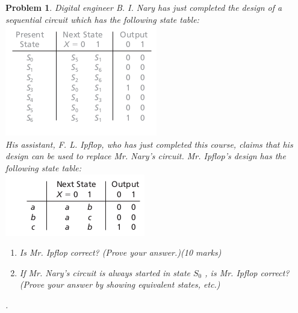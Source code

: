 \documentclass[twocolumn]{article}
\newtheorem{prob}{Problem}
\begin{document}
\begin{prob}
  Digital engineer B. I. Nary has just completed the design of a sequential circuit
  which has the following state table:\\
  \includegraphics[width=\linewidth]{fig-15.3a.png}\\
  His assistant, F. L. Ipflop, who has just completed this course, claims that
his design can be used to replace Mr. Nary’s circuit. Mr. Ipflop’s design has
the following state table:\\
\includegraphics[width=\linewidth]{fig-15.3b.png}\\
\begin{enumerate}
\item Is Mr. Ipflop correct? (Prove your answer.)(10 marks)
\item If Mr. Nary’s circuit is always started in state $S_0$ , is Mr. Ipflop correct? (Prove
  your answer by showing equivalent states, etc.)
  \end{enumerate} .
\end{prob}
\end{document}
